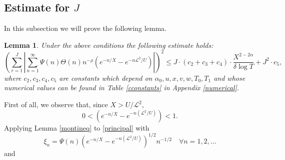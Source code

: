 \documentclass[reqno]{amsart}
\newtheorem{lemma}[theorem]{Lemma}
\numberwithin{equation}{section}
\theoremstyle{remark}
\begin{document}
\subsection{Estimate for $J$} In this subsection we will prove the following lemma.
\begin{lemma}\label{upperigma1}
    Under the above conditions the following estimate holds:
    \begin{equation*}
       \left(\sum_{r=1}^J\left|\sum_{n=1}^\infty\Psi(n)\Theta(n) n^{-\rho}\left(e^{-n / X}-e^{-n\mathscr{L}^2/U}\right)\right|\right)^2\le J\cdot (c_2+c_3+c_4)\cdot  \frac{ X^{2-2\alpha}}{\delta\log T}+J^2\cdot  c_5,
    \end{equation*}
    where $c_2,c_3,c_4,c_5$ are constants which depend on $\alpha_0,u,x,v,w,T_0,T_1$ and whose numerical values can be found in Table \ref{cconstants} in Appendix \ref{numerical}.
\end{lemma}
First of  all, we observe that, since $X>U/\mathscr{L}^2$,
\[0<(e^{-n/X}-e^{-n(\mathscr{L}^2/U)})<1.
\]
Applying Lemma \ref{montineq} to \eqref{principal} with
   \[
  \xi_n=\Psi(n)(e^{-n/X}-e^{-n(\mathscr{L}^2/U)})^{1/2}n^{-1/2}  \quad \forall n=1,2,\dots
  \]
and
\end{document}
